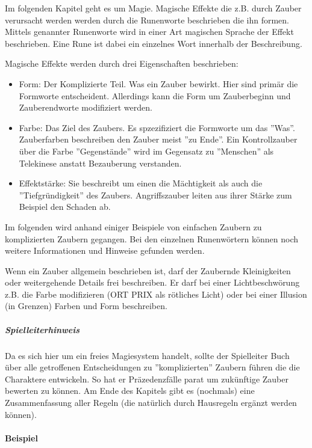\documentclass{article}
\begin{document}
Im folgenden Kapitel geht es um Magie. Magische Effekte die z.B. durch Zauber verursacht werden werden durch die
Runenworte beschrieben die ihn formen. Mittels genannter Runenworte wird in einer Art magischen Sprache der Effekt
beschrieben. Eine Rune ist dabei ein einzelnes Wort innerhalb der Beschreibung.

Magische Effekte werden durch drei Eigenschaften beschrieben:

\begin{itemize}
\item Form: Der Komplizierte Teil. Was ein Zauber bewirkt. Hier sind primär die Formworte entscheident. Allerdings kann die Form um Zauberbeginn und Zauberendworte modifiziert werden.
\item Farbe: Das Ziel des Zaubers. Es spzezifiziert die Formworte um das ''Was''. Zauberfarben beschreiben den Zauber meist ''zu Ende''. Ein Kontrollzauber über die Farbe ''Gegenstände'' wird im Gegensatz zu ''Menschen'' als Telekinese anstatt Bezauberung verstanden.
\item Effektstärke: Sie beschreibt um einen die Mächtigkeit als auch die ''Tiefgründigkeit'' des Zaubers. Angriffszauber leiten aus ihrer Stärke zum Beispiel den Schaden ab.
\end{itemize}

Im folgenden wird anhand einiger Beispiele von einfachen Zaubern zu komplizierten Zaubern gegangen. Bei den
einzelnen Runenwörtern können noch weitere Informationen und Hinweise gefunden werden.

Wenn ein Zauber allgemein beschrieben ist, darf der Zaubernde Kleinigkeiten oder weitergehende Details frei beschreiben.
Er darf bei einer Lichtbeschwörung z.B. die Farbe modifizieren (ORT PRIX als rötliches Licht) oder bei einer Illusion
(in Grenzen) Farben und Form beschreiben.

\begin{mdframed}[hidealllines=true, backgroundcolor=black!10]
\subparagraph{Spielleiterhinweis}

Da es sich hier um ein freies Magiesystem handelt, sollte der Spielleiter Buch über alle getroffenen Entscheidungen
zu ''komplizierten'' Zaubern führen die die Charaktere entwickeln. So hat er Präzedenzfälle parat um zukünftige
Zauber bewerten zu können. Am Ende des Kapitels gibt es (nochmals) eine Zusammenfassung aller Regeln (die natürlich
durch Hausregeln ergänzt werden können).

\end{mdframed}
\paragraph{Beispiel}
\end{document}
